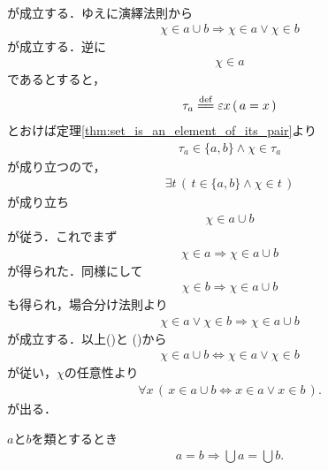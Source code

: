 \begin{sketch}
\begin{align}
		\end{align}
		が成立する．ゆえに演繹法則から
		\begin{align}
			\chi \in a \cup b \Longrightarrow \chi \in a \vee \chi \in b
			\label{fom:thm_union_of_pair_is_union_of_their_elements_2}
		\end{align}
		が成立する．逆に
		\begin{align}
			\chi \in a
		\end{align}
		であるとすると，
		\begin{align}
			\tau_a \defeq \varepsilon x\, (\, a = x\, )
		\end{align}
		とおけば定理\ref{thm:set_is_an_element_of_its_pair}より
		\begin{align}
			\tau_a \in \{a,b\} \wedge \chi \in \tau_a
		\end{align}
		が成り立つので，
		\begin{align}
			\exists t\, \left(\, t \in \{a,b\} \wedge \chi \in t\, \right)
		\end{align}
		が成り立ち
		\begin{align}
			\chi \in a \cup b
		\end{align}
		が従う．これでまず
		\begin{align}
			\chi \in a \Longrightarrow \chi \in a \cup b
		\end{align}
		が得られた．同様にして
		\begin{align}
			\chi \in b \Longrightarrow \chi \in a \cup b
		\end{align}
		も得られ，場合分け法則より
		\begin{align}
			\chi \in a \vee \chi \in b \Longrightarrow \chi \in a \cup b
			\label{fom:thm_union_of_pair_is_union_of_their_elements_3}
		\end{align}
		が成立する．以上()と
		()から
		\begin{align}
			\chi \in a \cup b \Longleftrightarrow \chi \in a \vee \chi \in b
		\end{align}
		が従い，$\chi$の任意性より
		\begin{align}
			\forall x\, (\, x \in a \cup b \Longleftrightarrow x \in a \vee x \in b\, ).
		\end{align}
		が出る．
		\QED
	\end{sketch}
	
	\begin{screen}
		\begin{thm}[等しい類の合併は等しい]\label{thm:unions_of_equal_classes_are_equal}
			$a$と$b$を類とするとき
			\begin{align}
				a = b \Longrightarrow \bigcup a = \bigcup b.
			\end{align}
		\end{thm}
	\end{screen}
	
